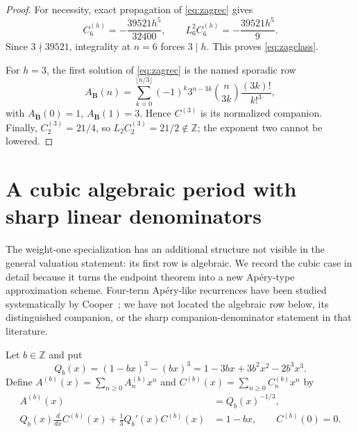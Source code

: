 \documentclass[11pt]{article}
\theoremstyle{remark}
\newcommand{\Z}{\mathbb Z}
\begin{document}
\begin{proof}
For necessity, exact propagation of \eqref{eq:zagrec} gives
\begin{equation}\label{eq:zagwitness}
 C^{(h)}_6=-\frac{39521h^5}{32400},
 \qquad
 L_6^2C^{(h)}_6=-\frac{39521h^5}{9}.
\end{equation}
Since $3\nmid39521$, integrality at $n=6$ forces $3\mid h$.  This proves
\eqref{eq:zagclass}.

For $h=3$, the first solution of \eqref{eq:zagrec} is the named sporadic row
\cite{Zagier,Gorodetsky}
\[
 A_{\mathbf B}(n)=
 \sum_{k=0}^{\lfloor n/3\rfloor}(-1)^k3^{n-3k}
 \binom n{3k}\frac{(3k)!}{k!^3},
\]
with $A_{\mathbf B}(0)=1$, $A_{\mathbf B}(1)=3$.  Hence $C^{(3)}$ is its
normalized companion.  Finally,
$C^{(3)}_2=21/4$, so $L_2C^{(3)}_2=21/2\notin\Z$; the exponent two cannot be
lowered.
\end{proof}

\section{A cubic algebraic period with sharp linear denominators}
\label{sec:cubicperiod}

The weight-one specialization has an additional structure not visible in the
general valuation statement: its first row is algebraic.  We record the cubic
case in detail because it turns the endpoint theorem into a new Ap\'ery-type
approximation scheme.  Four-term Ap\'ery-like recurrences have been studied
systematically by Cooper~\cite{CooperFour}; we have not located the algebraic
row below, its distinguished companion, or the sharp companion-denominator
statement in that literature.

Let $b\in\Z$ and put
\begin{equation}\label{eq:cubicQ}
 Q_b(x)=(1-bx)^3-(bx)^3
       =1-3bx+3b^2x^2-2b^3x^3.
\end{equation}
Define $A^{(b)}(x)=\sum_{n\ge0}A^{(b)}_nx^n$ and
$C^{(b)}(x)=\sum_{n\ge0}C^{(b)}_nx^n$ by
\begin{align}
 A^{(b)}(x)&=Q_b(x)^{-1/3},\label{eq:cubicA}\\
 Q_b(x)\frac{d}{dx}C^{(b)}(x)
  +\frac13Q_b'(x)C^{(b)}(x)&=1-bx,
  \qquad C^{(b)}(0)=0.\label{eq:cubicC}
\end{align}
\end{document}
